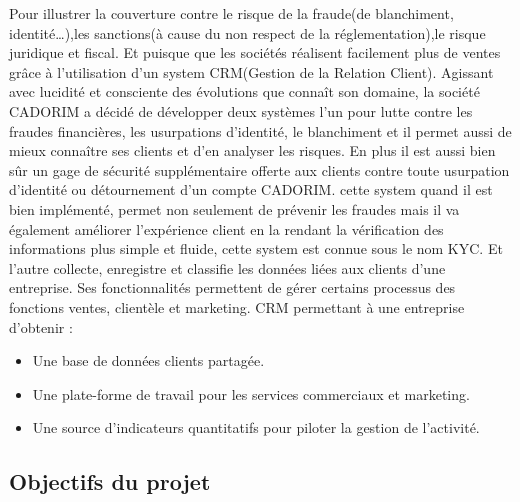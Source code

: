Pour illustrer la couverture contre le risque de la fraude(de blanchiment, identité…),les sanctions(à cause du non respect de la réglementation),le risque juridique et fiscal.
Et puisque que les sociétés  réalisent facilement plus de ventes grâce à l’utilisation d’un system CRM(Gestion de la Relation Client).\newline
Agissant avec lucidité et consciente des évolutions que connaît son domaine, la société CADORIM a décidé de développer deux systèmes l'un pour lutte contre les fraudes financières, les usurpations d’identité, le blanchiment et il permet aussi de mieux connaître ses clients et d’en analyser les risques.
En plus il  est aussi bien sûr un gage de sécurité supplémentaire offerte aux clients contre toute usurpation d’identité ou détournement d’un compte CADORIM. cette system quand il est bien implémenté, permet non seulement de prévenir les fraudes mais il va également améliorer l’expérience client en la rendant la vérification des informations plus simple et fluide, cette system est connue sous le nom KYC.
Et l'autre collecte, enregistre et classifie les données liées aux clients d’une entreprise. Ses fonctionnalités permettent de gérer certains processus des fonctions ventes, clientèle et marketing.
CRM permettant à une entreprise d'obtenir :
\begin{itemize}[label=$\ast$]
\item Une base de données clients partagée.
\item Une plate-forme de travail pour les services commerciaux et marketing.
\item Une source d’indicateurs quantitatifs pour piloter la gestion de l’activité.
\end{itemize}

\subsection{Objectifs du projet}

